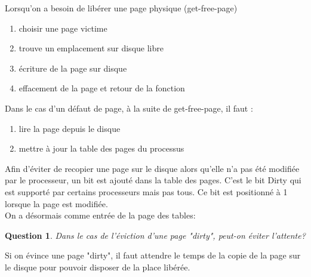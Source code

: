 \documentclass[12pt,a4paper]{report}
\newtheorem*{q}{Question}
\begin{document}
Lorsqu'on a besoin de libérer une page physique (get-free-page)
\begin{enumerate}
\item choisir une page victime
\item trouve un emplacement sur disque libre
\item écriture de la page sur disque
\item effacement de la page et retour de la fonction\\
\end{enumerate} 

Dans le cas d'un défaut de page, à la suite de get-free-page, il faut :
\begin{enumerate}
\item lire la page depuis le disque
\item mettre à jour la table des pages du processus\\
\end{enumerate}

Afin d'éviter de recopier une page sur le disque alors qu'elle n'a pas été modifiée par le processeur, un bit est ajouté dans la table des pages. C'est le bit Dirty qui est supporté par certains processeurs mais pas tous. Ce bit est positionné à 1 lorsque la page est modifiée.\\

On a désormais comme entrée de la page des tables:\\
\begin{center}
\end{center}

\begin{q}Dans le cas de l'éviction d'une page "dirty", peut-on éviter l'attente?\end{q}
Si on évince une page "dirty", il faut attendre le temps de la copie de la page sur le disque pour pouvoir disposer de la place libérée.\\
\end{document}
